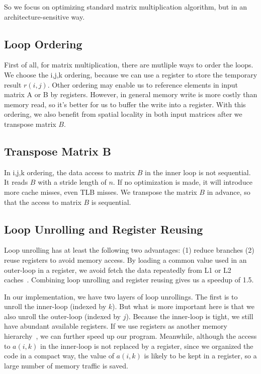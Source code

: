 \documentclass[twocolumn,letterpaper,10pt]{article}
\begin{document}
So we focus on optimizing standard matrix
multiplication algorithm, but in an architecture-sensitive way.

\subsection{Loop Ordering}
First of all, for matrix multiplication, there are mutliple ways to order the
loops. We choose the i,j,k ordering, because
we can use a register to store the temporary result
$r(i,j)$. Other ordering may enable us to reference elements in input
matrix A or B by registers. However, in general memory write is more
costly than memory read, so it's better for us to buffer the
write into a register. With this ordering, we also benefit from
spatial locality in both input matrices after we transpose matrix $B$.

\subsection{Transpose Matrix B}
In i,j,k ordering, the data access to matrix $B$
in the inner loop is not sequential. It reads $B$ with a stride length
of $n$. If no optimization is made, it will
introduce more cache misses, even TLB misses. We transpose the matrix $B$ in advance, so that the access to matrix $B$ is sequential.

\subsection{Loop Unrolling and Register Reusing}
Loop unrolling has at least the following
two advantages: (1) reduce branches (2) reuse registers to avoid memory
access. By loading a common value used in an outer-loop in a register,
we avoid fetch the data repeatedly from L1 or L2 caches~\cite{revisited,berkeley}. Combining
loop unrolling and register reusing gives us a speedup of 1.5.

In our implementation, we have two layers of loop unrollings. The first
is to unroll the inner-loop (indexed by $k$). But what is more
important here is that  we also unroll the outer-loop (indexed by $j$). Because
the inner-loop is tight, we still have abundant available
registers. If we use registers as another memory hierarchy~\cite{revisited},
we can further speed up our program. Meanwhile, although the access to
$a(i,k)$ in the inner-loop is not replaced by a register, since we
organized the code in a compact way, the value of $a(i,k)$ is likely
to be kept in a register, so a large number of memory traffic is
saved.
\end{document}
